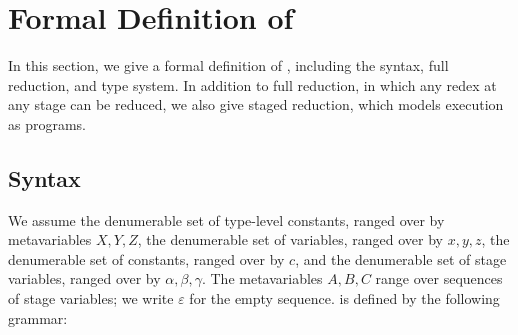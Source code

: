 
\section{Formal Definition of \LMD}

In this section, we give a formal definition of \LMD, including
the syntax, full reduction, and type system.  In addition to full reduction,
in which any redex at any stage can be reduced, we also give staged reduction,
which models execution as programs.

\subsection{Syntax}

We assume the denumerable set of type-level constants, ranged over by
metavariables \(X, Y, Z\), the denumerable set of variables, ranged
over by \(x,y,z\), the denumerable set of constants, ranged over by
\(c\), and the denumerable set of stage variables, ranged over by
\(\alpha, \beta, \gamma\).  The metavariables \(A, B, C\) range over
sequences of stage variables; we write \(\varepsilon\) for the empty
sequence. \LMD is defined by the following grammar:


